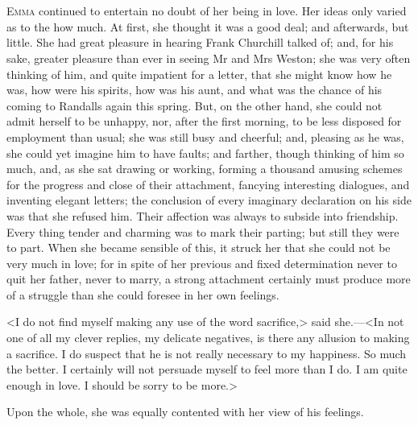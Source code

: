 \chapter[Chapter \thechapter]{}
\lettrine[lraise=0.3]{E}{mma} continued to entertain no doubt of her being in love. Her ideas only varied as to the how much. At first, she thought it was a good deal; and afterwards, but little. She had great pleasure in hearing Frank Churchill talked of; and, for his sake, greater pleasure than ever in seeing Mr and Mrs Weston; she was very often thinking of him, and quite impatient for a letter, that she might know how he was, how were his spirits, how was his aunt, and what was the chance of his coming to Randalls again this spring. But, on the other hand, she could not admit herself to be unhappy, nor, after the first morning, to be less disposed for employment than usual; she was still busy and cheerful; and, pleasing as he was, she could yet imagine him to have faults; and farther, though thinking of him so much, and, as she sat drawing or working, forming a thousand amusing schemes for the progress and close of their attachment, fancying interesting dialogues, and inventing elegant letters; the conclusion of every imaginary declaration on his side was that she refused him. Their affection was always to subside into friendship. Every thing tender and charming was to mark their parting; but still they were to part. When she became sensible of this, it struck her that she could not be very much in love; for in spite of her previous and fixed determination never to quit her father, never to marry, a strong attachment certainly must produce more of a struggle than she could foresee in her own feelings.

<I do not find myself making any use of the word sacrifice,> said she.—<In not one of all my clever replies, my delicate negatives, is there any allusion to making a sacrifice. I do suspect that he is not really necessary to my happiness. So much the better. I certainly will not persuade myself to feel more than I do. I am quite enough in love. I should be sorry to be more.>

Upon the whole, she was equally contented with her view of his feelings.

